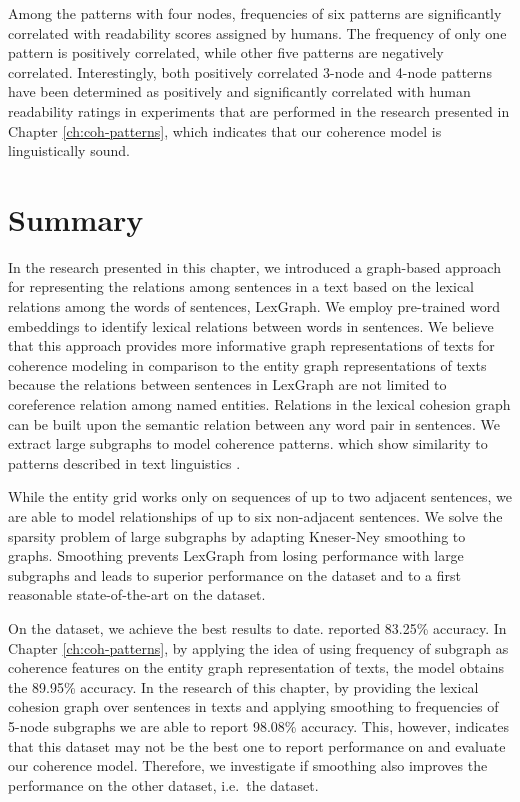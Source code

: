 Among the patterns with four nodes, frequencies of six patterns are significantly correlated with readability scores assigned by humans. 
The frequency of only one pattern is positively correlated, while other five patterns are negatively correlated. 
Interestingly, both positively correlated 3-node and 4-node patterns have been determined as positively and significantly correlated with human readability ratings in experiments that are performed in the research presented in Chapter \ref{ch:coh-patterns}, which indicates that our coherence model is linguistically sound.  

\section{Summary}
\label{sec:lex-graph-summary}

In the research presented in this chapter, we introduced a graph-based approach for representing the relations among sentences in a text based on the lexical relations among the words of sentences, LexGraph. 
We employ pre-trained word embeddings to identify lexical relations between words in sentences. 
We believe that this approach provides more informative graph representations of texts for coherence modeling in comparison to the entity graph representations of texts because the relations between sentences in LexGraph are not limited to coreference relation among named entities. 
Relations in the lexical cohesion graph can be built upon the semantic relation between any word pair in sentences. 
We extract large subgraphs to model coherence patterns. 
 which show similarity to patterns described in
text linguistics \cite{danes74a}.

While the entity grid works only on sequences of up to two adjacent sentences, we are able to model relationships of up to six non-adjacent sentences. 
We solve the sparsity problem of large subgraphs by adapting \mbox{Kneser-Ney} smoothing to graphs. 
Smoothing prevents LexGraph from losing performance with large subgraphs and leads to superior performance on the  dataset and to a first reasonable \mbox{state-of-the-art} on the  dataset.

On the \pitlerds dataset, we achieve the best results to date.  
 reported 83.25\% accuracy. 
In Chapter \ref{ch:coh-patterns}, by applying the idea of using frequency of subgraph as coherence features on the entity graph representation of texts, the model obtains the 89.95\% accuracy. 
In the research of this chapter, by providing the lexical cohesion graph over sentences in texts and applying smoothing to frequencies of 5-node subgraphs we are able to report 98.08\% accuracy. 
This, however, indicates that this dataset may not be the best one to report performance on and evaluate our coherence model. 
Therefore, we investigate if smoothing also improves the performance on the other dataset, i.e.\ the \declercqds dataset.


